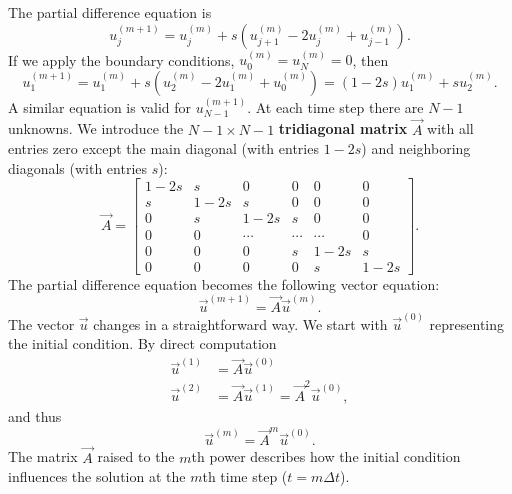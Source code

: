 The partial difference equation is
\begin{equation}
u_j^{(m+1)} = u_j^{(m)} + s\left(u_{j+1}^{(m)} - 2u_j^{(m)} + u_{j-1}^{(m)}\right).
\label{eq:6.3.45}
\end{equation}
If we apply the boundary conditions, $u_0^{(m)} = u_N^{(m)} = 0$, then
\[
u_1^{(m+1)} = u_1^{(m)} + s\left(u_2^{(m)} - 2u_1^{(m)} + u_0^{(m)}\right) = (1-2s)u_1^{(m)} + su_2^{(m)}.
\]
A similar equation is valid for $u_{N-1}^{(m+1)}$.  At each time step there are $N-1$ unknowns.  We introduce the $N-1 \times N-1$ \textbf{tridiagonal matrix} $\vec{A}$ with all entries zero except the main diagonal (with entries $1-2s$) and neighboring diagonals (with entries $s$):
\begin{equation}
\vec{A} = \begin{bmatrix}
1-2s & s & 0 & 0 & 0 & 0 \\
s & 1-2s & s & 0 & 0 & 0 \\
0 & s & 1-2s & s & 0 & 0 \\
0 & 0 & \cdots & \cdots & \cdots & 0 \\
0 & 0 & 0 & s & 1-2s & s \\
0 & 0 & 0 & 0 & s & 1-2s
\end{bmatrix}.
\label{eq:6.3.46}
\end{equation}
The partial difference equation becomes the following vector equation:
\begin{equation}
\vec{u}^{(m+1)} = \vec{A}\vec{u}^{(m)}.
\label{eq:6.3.47}
\end{equation}
The vector $\vec{u}$ changes in a straightforward way.  We start with $\vec{u}^{(0)}$ representing the initial condition.  By direct computation
\begin{align*}
\vec{u}^{(1)} &= \vec{A}\vec{u}^{(0)} \\
\vec{u}^{(2)} &= \vec{A}\vec{u}^{(1)} = \vec{A}^2\vec{u}^{(0)},
\end{align*}
and thus
\begin{equation}
\vec{u}^{(m)} = \vec{A}^m\vec{u}^{(0)}.
\label{eq:6.3.48}
\end{equation}
The matrix $\vec{A}$ raised to the $m$th power describes how the initial condition influences the solution at the $m$th time step ($t = m\Delta t$).

